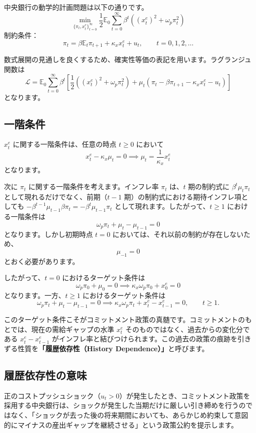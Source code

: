 \documentclass[
  japanese,
  lualatex,
  ja=standard,
  12pt,
  a4paper]{ltjsarticle}
\begin{document}
中央銀行の動学的計画問題は以下の通りです。 \[
\min_{\{\pi_t,x_t^e\}_{t=0}^{\infty}}
\frac{1}{2}
\mathbb{E}_0
\sum_{t=0}^{\infty}
\beta^t
\left(
\left(x_t^e\right)^2+\omega_p\pi_t^2
\right)
\] 制約条件： \[
\pi_t
=
\beta\mathbb{E}_t\pi_{t+1}
+\kappa_x x_t^e
+u_t,
\qquad
t=0,1,2,\ldots
\]

数式展開の見通しを良くするため、確実性等価の表記を用います。ラグランジュ関数は
\[
\mathcal{L}
=
\mathbb{E}_0
\sum_{t=0}^{\infty}
\beta^t
\left[
\frac{1}{2}
\left(
\left(x_t^e\right)^2+\omega_p\pi_t^2
\right)
+\mu_t
\left(
\pi_t-\beta\pi_{t+1}-\kappa_x x_t^e-u_t
\right)
\right]
\] となります。

\subsection{一階条件}\label{ux4e00ux968eux6761ux4ef6}

\(x_t^e\) に関する一階条件は、任意の時点 \(t \geq 0\) において \[
x_t^e-\kappa_x\mu_t=0
\implies
\mu_t=\frac{1}{\kappa_x}x_t^e
\] となります。

次に \(\pi_t\) に関する一階条件を考えます。インフレ率 \(\pi_t\)
は、\(t\) 期の制約式に \(\beta^t \mu_t \pi_t\)
として現れるだけでなく、前期（\(t-1\)
期）の制約式における期待インフレ項としても
\(-\beta^{t-1} \mu_{t-1} \beta \pi_t = -\beta^t \mu_{t-1} \pi_t\)
として現れます。したがって、\(t \geq 1\) における一階条件は \[
\omega_p\pi_t+\mu_t-\mu_{t-1}=0
\] となります。しかし初期時点 \(t=0\)
においては、それ以前の制約が存在しないため、 \[
\mu_{-1}=0
\] とおく必要があります。

したがって、\(t=0\) におけるターゲット条件は \[
\omega_p\pi_0+\mu_0=0
\implies
\kappa_x\omega_p\pi_0+x_0^e=0
\] となります。一方、\(t \geq 1\) におけるターゲット条件は \[
\omega_p\pi_t+\mu_t-\mu_{t-1}=0
\implies
\kappa_x\omega_p\pi_t+x_t^e-x_{t-1}^e=0,
\qquad
t\geq1.
\]

このターゲット条件こそがコミットメント政策の真髄です。コミットメントのもとでは、現在の需給ギャップの水準
\(x_t^e\) そのものではなく、過去からの変化分である \(x_t^e - x_{t-1}^e\)
がインフレ率と結びつけられます。この過去の政策の痕跡を引きずる性質を\textbf{「履歴依存性（History
Dependence）」}と呼びます。

\subsection{履歴依存性の意味}\label{ux5c65ux6b74ux4f9dux5b58ux6027ux306eux610fux5473}

正のコストプッシュショック（\(u_t>0\)）が発生したとき、コミットメント政策を採用する中央銀行は、ショックが発生した当期だけに厳しい引き締めを行うのではなく、「ショックが去った後の将来期間においても、あらかじめ約束して意図的にマイナスの産出ギャップを継続させる」という政策公約を提示します。
\end{document}

